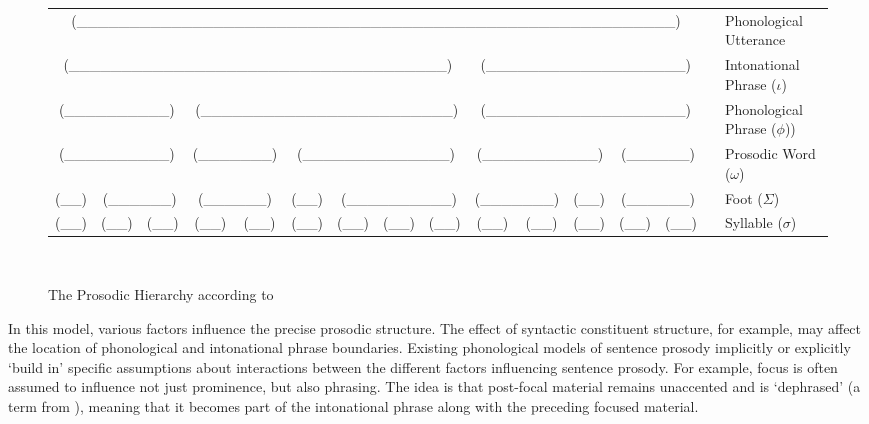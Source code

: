 \documentclass[preprint,review,12pt,authoryear,times]{elsarticle}
\begin{document}
\begin{figure}[!ht]
	\begin{center}
\setlength{\tabcolsep}{0in}
{\footnotesize
\begin{tabular}{cccccccccccccccl}
\\
\multicolumn{14}{c}{(\_\_\_\_\_\_\_\_\_\_\_\_\_\_\_\_\_\_\_\_\_\_\_\_\_\_\_\_\_\_\_\_\_\_\_\_\_\_\_\_\_\_\_\_\_\_\_\_\_\_\_\_\_\_\_\_\_)}&\hspace{1em}&Phonological Utterance\\
\multicolumn{9}{c}{(\_\_\_\_\_\_\_\_\_\_\_\_\_\_\_\_\_\_\_\_\_\_\_\_\_\_\_\_\_\_\_\_\_\_\_\_)}&\multicolumn{5}{c}{(\_\_\_\_\_\_\_\_\_\_\_\_\_\_\_\_\_\_\_)}&\hspace{1em}{ }&Intonational Phrase ($\iota$)\\
\multicolumn{3}{c}{(\_\_\_\_\_\_\_\_\_\_)}&\multicolumn{6}{c}{(\_\_\_\_\_\_\_\_\_\_\_\_\_\_\_\_\_\_\_\_\_\_\_\_)}&\multicolumn{5}{c}{(\_\_\_\_\_\_\_\_\_\_\_\_\_\_\_\_\_\_\_)}&\hspace{1em}&Phonological Phrase ($\phi$))\\
\multicolumn{3}{c}{(\_\_\_\_\_\_\_\_\_\_)}&\multicolumn{2}{c}{(\_\_\_\_\_\_\_)}&\multicolumn{4}{c}{(\_\_\_\_\_\_\_\_\_\_\_\_\_\_)}&\multicolumn{3}{c}{(\_\_\_\_\_\_\_\_\_\_\_)}&\multicolumn{2}{c}{(\_\_\_\_\_\_)}&\hspace{1em}&Prosodic Word ($\omega$)\\
(\_\_)&\multicolumn{2}{c}{(\_\_\_\_\_\_)}&\multicolumn{2}{c}{(\_\_\_\_\_\_)}&(\_\_)&\multicolumn{3}{c}{(\_\_\_\_\_\_\_\_\_\_)}&\multicolumn{2}{c}{(\_\_\_\_\_\_\_)}&(\_\_)&\multicolumn{2}{c}{(\_\_\_\_\_\_)}&\hspace{1em}&Foot ($\Sigma$)\\
(\_\_)&(\_\_)&(\_\_)&(\_\_)&(\_\_)&(\_\_)&(\_\_)&(\_\_)&(\_\_)&(\_\_)&(\_\_)&(\_\_)&(\_\_)&(\_\_)&\hspace{1em}&Syllable ($\sigma$)\\
\end{tabular}}
\ \\
\caption{The Prosodic Hierarchy according to \citet[384]{selki86}}
\label{phi}
\end{center}
\end{figure}

In this model, various factors influence the precise prosodic structure. The effect of syntactic constituent structure, for example, may affect the location of phonological and intonational phrase boundaries. Existing phonological models of sentence prosody implicitly or explicitly `build in' specific assumptions about interactions between the different factors influencing sentence prosody. For example, focus is often assumed to influence not just prominence, but also phrasing. The idea is that post-focal material remains unaccented and is `dephrased' (a term from \citealt{jun00}), meaning that it becomes part of the intonational phrase along with the preceding focused material. 
\end{document}
